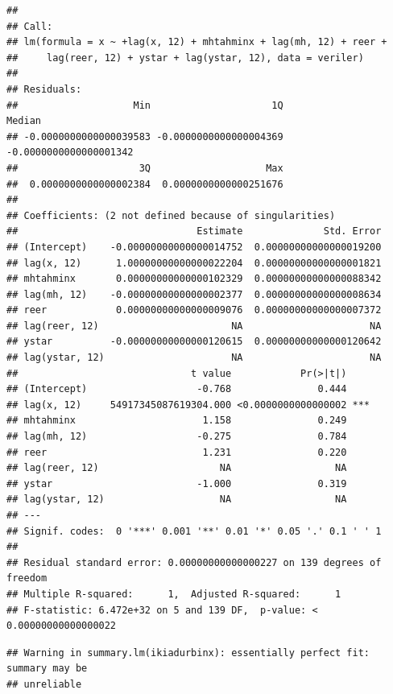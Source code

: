 \documentclass[]{article}
\newenvironment{Shaded}{\begin{snugshade}}{\end{snugshade}}
\newcommand{\KeywordTok}[1]{\textcolor[rgb]{0.13,0.29,0.53}{\textbf{#1}}}
\newcommand{\DecValTok}[1]{\textcolor[rgb]{0.00,0.00,0.81}{#1}}
\newcommand{\StringTok}[1]{\textcolor[rgb]{0.31,0.60,0.02}{#1}}
\newcommand{\OperatorTok}[1]{\textcolor[rgb]{0.81,0.36,0.00}{\textbf{#1}}}
\newcommand{\NormalTok}[1]{#1}
\begin{document}
\begin{verbatim}
## 
## Call:
## lm(formula = x ~ +lag(x, 12) + mhtahminx + lag(mh, 12) + reer + 
##     lag(reer, 12) + ystar + lag(ystar, 12), data = veriler)
## 
## Residuals:
##                    Min                     1Q                 Median 
## -0.0000000000000039583 -0.0000000000000004369 -0.0000000000000001342 
##                     3Q                    Max 
##  0.0000000000000002384  0.0000000000000251676 
## 
## Coefficients: (2 not defined because of singularities)
##                               Estimate              Std. Error
## (Intercept)    -0.00000000000000014752  0.00000000000000019200
## lag(x, 12)      1.00000000000000022204  0.00000000000000001821
## mhtahminx       0.00000000000000102329  0.00000000000000088342
## lag(mh, 12)    -0.00000000000000002377  0.00000000000000008634
## reer            0.00000000000000009076  0.00000000000000007372
## lag(reer, 12)                       NA                      NA
## ystar          -0.00000000000000120615  0.00000000000000120642
## lag(ystar, 12)                      NA                      NA
##                              t value            Pr(>|t|)    
## (Intercept)                   -0.768               0.444    
## lag(x, 12)     54917345087619304.000 <0.0000000000000002 ***
## mhtahminx                      1.158               0.249    
## lag(mh, 12)                   -0.275               0.784    
## reer                           1.231               0.220    
## lag(reer, 12)                     NA                  NA    
## ystar                         -1.000               0.319    
## lag(ystar, 12)                    NA                  NA    
## ---
## Signif. codes:  0 '***' 0.001 '**' 0.01 '*' 0.05 '.' 0.1 ' ' 1
## 
## Residual standard error: 0.00000000000000227 on 139 degrees of freedom
## Multiple R-squared:      1,  Adjusted R-squared:      1 
## F-statistic: 6.472e+32 on 5 and 139 DF,  p-value: < 0.00000000000000022
\end{verbatim}

\begin{Shaded}
\end{Shaded}

\begin{verbatim}
## Warning in summary.lm(ikiadurbinx): essentially perfect fit: summary may be
## unreliable
\end{verbatim}
\end{document}
